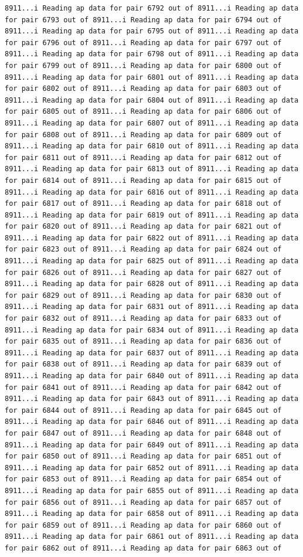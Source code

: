 \documentclass[
]{article}
\begin{document}
\begin{verbatim}
8911...i Reading ap data for pair 6792 out of 8911...i Reading ap data for pair 6793 out of 8911...i Reading ap data for pair 6794 out of 8911...i Reading ap data for pair 6795 out of 8911...i Reading ap data for pair 6796 out of 8911...i Reading ap data for pair 6797 out of 8911...i Reading ap data for pair 6798 out of 8911...i Reading ap data for pair 6799 out of 8911...i Reading ap data for pair 6800 out of 8911...i Reading ap data for pair 6801 out of 8911...i Reading ap data for pair 6802 out of 8911...i Reading ap data for pair 6803 out of 8911...i Reading ap data for pair 6804 out of 8911...i Reading ap data for pair 6805 out of 8911...i Reading ap data for pair 6806 out of 8911...i Reading ap data for pair 6807 out of 8911...i Reading ap data for pair 6808 out of 8911...i Reading ap data for pair 6809 out of 8911...i Reading ap data for pair 6810 out of 8911...i Reading ap data for pair 6811 out of 8911...i Reading ap data for pair 6812 out of 8911...i Reading ap data for pair 6813 out of 8911...i Reading ap data for pair 6814 out of 8911...i Reading ap data for pair 6815 out of 8911...i Reading ap data for pair 6816 out of 8911...i Reading ap data for pair 6817 out of 8911...i Reading ap data for pair 6818 out of 8911...i Reading ap data for pair 6819 out of 8911...i Reading ap data for pair 6820 out of 8911...i Reading ap data for pair 6821 out of 8911...i Reading ap data for pair 6822 out of 8911...i Reading ap data for pair 6823 out of 8911...i Reading ap data for pair 6824 out of 8911...i Reading ap data for pair 6825 out of 8911...i Reading ap data for pair 6826 out of 8911...i Reading ap data for pair 6827 out of 8911...i Reading ap data for pair 6828 out of 8911...i Reading ap data for pair 6829 out of 8911...i Reading ap data for pair 6830 out of 8911...i Reading ap data for pair 6831 out of 8911...i Reading ap data for pair 6832 out of 8911...i Reading ap data for pair 6833 out of 8911...i Reading ap data for pair 6834 out of 8911...i Reading ap data for pair 6835 out of 8911...i Reading ap data for pair 6836 out of 8911...i Reading ap data for pair 6837 out of 8911...i Reading ap data for pair 6838 out of 8911...i Reading ap data for pair 6839 out of 8911...i Reading ap data for pair 6840 out of 8911...i Reading ap data for pair 6841 out of 8911...i Reading ap data for pair 6842 out of 8911...i Reading ap data for pair 6843 out of 8911...i Reading ap data for pair 6844 out of 8911...i Reading ap data for pair 6845 out of 8911...i Reading ap data for pair 6846 out of 8911...i Reading ap data for pair 6847 out of 8911...i Reading ap data for pair 6848 out of 8911...i Reading ap data for pair 6849 out of 8911...i Reading ap data for pair 6850 out of 8911...i Reading ap data for pair 6851 out of 8911...i Reading ap data for pair 6852 out of 8911...i Reading ap data for pair 6853 out of 8911...i Reading ap data for pair 6854 out of 8911...i Reading ap data for pair 6855 out of 8911...i Reading ap data for pair 6856 out of 8911...i Reading ap data for pair 6857 out of 8911...i Reading ap data for pair 6858 out of 8911...i Reading ap data for pair 6859 out of 8911...i Reading ap data for pair 6860 out of 8911...i Reading ap data for pair 6861 out of 8911...i Reading ap data for pair 6862 out of 8911...i Reading ap data for pair 6863 out of 
\end{verbatim}
\end{document}
